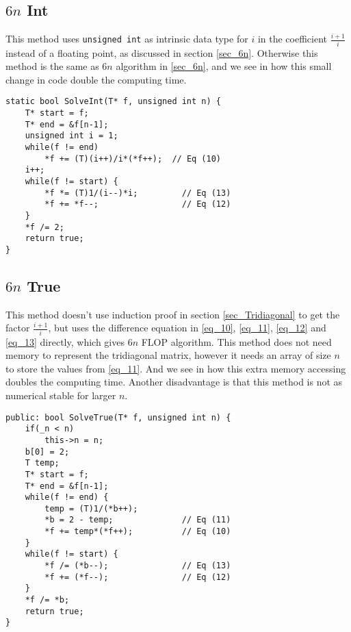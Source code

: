 \documentclass[11pt,english,a4paper]{article}
\begin{document}
\begin{flushleft}
\subsection{$6n$ Int}

This method uses \texttt{unsigned int} as intrinsic data type for $i$ in the coefficient $\frac{i+1}{i}$ instead of a floating point, as discussed in section \ref{sec_6n}. Otherwise this method is the same as $6n$ algorithm in \ref{sec_6n}, and we see in  how this small change in code double the computing time.

\begin{lstlisting}[frame=single, caption={\texttt{Matrix<MatrixType::Tridiagonal\_minus1\_2\_minus1\_6n, T>::SolveInt}}]  
static bool SolveInt(T* f, unsigned int n) {
	T* start = f;
	T* end = &f[n-1];
	unsigned int i = 1;
	while(f != end)
		*f += (T)(i++)/i*(*f++);  // Eq (10)
	i++;
	while(f != start) {
		*f *= (T)1/(i--)*i;         // Eq (13) 
		*f += *f--;                 // Eq (12)
	}
	*f /= 2;
	return true;
}
\end{lstlisting}

\subsection{$6n$ True}

This method doesn't use induction proof in section \ref{sec_Tridiagonal} to get the factor $\frac{i+1}{i}$, but uses the difference equation in \eqref{eq_10}, \eqref{eq_11}, \eqref{eq_12} and \eqref{eq_13} directly, which gives $6n$ FLOP algorithm. This method does not need memory to represent the tridiagonal matrix, however it needs an array of size $n$ to store the values from \eqref{eq_11}. And we see in  how this extra memory accessing doubles the computing time. Another disadvantage is that this method is not as numerical stable for larger $n$. 

\begin{lstlisting}[frame=single, caption={\texttt{Matrix<MatrixType::Tridiagonal\_minus1\_2\_minus1\_6n, T>::SolveTrue}}]  
public: bool SolveTrue(T* f, unsigned int n) {
	if(_n < n)
		this->n = n;
	b[0] = 2;
	T temp;
	T* start = f;
	T* end = &f[n-1];
	while(f != end) {
		temp = (T)1/(*b++);
		*b = 2 - temp;              // Eq (11)
		*f += temp*(*f++);          // Eq (10)
	}
	while(f != start) {
		*f /= (*b--);               // Eq (13)
		*f += (*f--);               // Eq (12)
	}
	*f /= *b;
	return true;
}
\end{lstlisting}


\end{flushleft}
\end{document}

